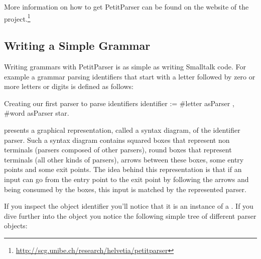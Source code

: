 \documentclass[a4paper,10pt,twoside]{book}
\begin{document}
More information on how to get PetitParser can be found on the website
of the
project.\footnote{\url{http://scg.unibe.ch/research/helvetia/petitparser}}

\subsection{Writing a Simple Grammar}

Writing grammars with PetitParser is as simple as writing Smalltalk
code. For example a grammar parsing identifiers that start with a
letter followed by zero or more letters or digits is defined as
follows:

\begin{script}[identifier]{Creating our first parser to parse identifiers}
identifier := #letter asParser , #word asParser star.  
\end{script}


 presents a graphical representation, called a
syntax diagram, of the identifier parser. Such a syntax diagram
contains squared boxes that represent non terminals (parsers composed
of other parsers), round boxes that represent terminals (all other
kinds of parsers), arrows between these boxes, some entry points and
some exit points. The idea behind this representation is that if an
input can go from the entry point to the exit point by following the
arrows and being consumed by the boxes, this input is matched by the
represented parser.

If you inspect the object identifier you'll notice that it is an
instance of a . If you dive further into the
object you notice the following simple tree of different parser
objects:
\end{document}
